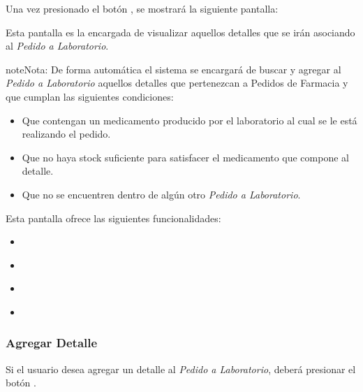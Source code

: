\documentclass[a4paper,10pt,spanish]{sphinxmanual}
\begin{document}
Una vez presionado el botón , se mostrará la siguiente pantalla:


Esta pantalla es la encargada de visualizar aquellos detalles que se irán asociando al \emph{Pedido a Laboratorio}.

\begin{notice}{note}{Nota:}
De forma automática el sistema se encargará de buscar y agregar al \emph{Pedido a Laboratorio} aquellos detalles que pertenezcan a Pedidos de Farmacia y que cumplan las siguientes condiciones:
\begin{itemize}
\item {} 
Que contengan un medicamento producido por el laboratorio al cual se le está realizando el pedido.

\item {} 
Que no haya stock suficiente para satisfacer el medicamento que compone al detalle.

\item {} 
Que no se encuentren dentro de algún otro \emph{Pedido a Laboratorio}.

\end{itemize}
\end{notice}

Esta pantalla ofrece las siguientes funcionalidades:
\begin{itemize}
\item {} 
{\hyperref[pedidosalab:agregar\string-detalle\string-pl]{}}

\item {} 
{\hyperref[pedidosalab:modificar\string-detalle\string-pl]{}}

\item {} 
{\hyperref[pedidosalab:eliminar\string-detalle\string-pl]{}}

\item {} 
{\hyperref[pedidosalab:registrar\string-pedido\string-pl]{}}

\end{itemize}


\subsubsection{Agregar Detalle}
\label{pedidosalab:agregar-detalle-pl}\label{pedidosalab:agregar-detalle}
Si el usuario desea agregar un detalle al \emph{Pedido a Laboratorio}, deberá presionar el botón .
\end{document}
